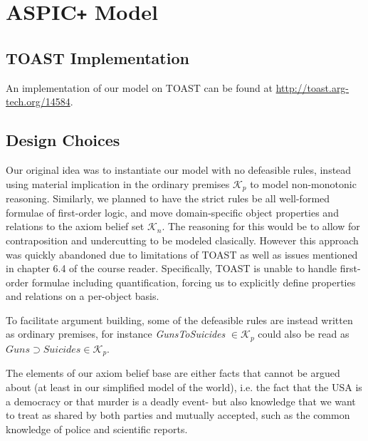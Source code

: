 \documentclass[]{article}
\begin{document}
\section{ASPIC\texttt{+} Model}\label{sec3}
\subsection{TOAST Implementation}
An implementation of our model on TOAST\cite{TOAST} can be found at \url{http://toast.arg-tech.org/14584}.
\subsection{Design Choices}
Our original idea was to instantiate our model with no defeasible rules, instead using material implication in the ordinary premises $\mathcal{K}_p$ to model non-monotonic reasoning. Similarly, we planned to have the strict rules be all well-formed formulae of first-order logic, and move domain-specific object properties and relations to the axiom belief set $\mathcal{K}_n$. The reasoning for this would be to allow for contraposition and undercutting to be modeled clasically. However this approach was quickly abandoned due to limitations of TOAST as well as issues mentioned in chapter 6.4 of the course reader. Specifically, TOAST is unable to handle first-order formulae including quantification, forcing us to explicitly define properties and relations on a per-object basis.

To facilitate argument building, some of the defeasible rules are instead written as ordinary premises, for instance \textit{GunsToSuicides} $\in \mathcal{K}_p$ could also be read as $Guns \supset Suicides \in \mathcal{K}_p$. 

The elements of our axiom belief base are either facts that cannot be argued about (at least in our simplified model of the world), i.e. the fact that the USA is a democracy or that murder is a deadly event- but also knowledge that we want to treat as shared by both parties and mutually accepted, such as the common knowledge of police and scientific reports. 
\end{document}
